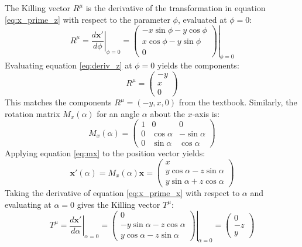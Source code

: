 \documentclass[11pt, a4paper]{report}
\begin{document}
The Killing vector $R^\mu$ is the derivative of the transformation in equation \eqref{eq:x_prime_z} with respect to the parameter $\phi$, evaluated at $\phi = 0$:
\begin{equation} R^\mu = \left. \frac{d\mathbf{x}'}{d\phi} \right|_{\phi=0} = \left. \begin{pmatrix} -x\sin\phi - y\cos\phi \\ x\cos\phi - y\sin\phi \\ 0 \end{pmatrix} \right|_{\phi=0} \label{eq:deriv_z} \end{equation}
Evaluating equation \eqref{eq:deriv_z} at $\phi = 0$ yields the components:
\begin{equation} R^\mu = \begin{pmatrix} -y \\ x \\ 0 \end{pmatrix} \label{eq:R_z_final} \end{equation}
This matches the components $R^\mu = (-y, x, 0)$ from the textbook.
Similarly, the rotation matrix $M_x(\alpha)$ for an angle $\alpha$ about the $x$-axis is:
\begin{equation} M_x(\alpha) = \begin{pmatrix} 1 & 0 & 0 \\ 0 & \cos\alpha & -\sin\alpha \\ 0 & \sin\alpha & \cos\alpha \end{pmatrix} \label{eq:mx} \end{equation}
Applying equation \eqref{eq:mx} to the position vector yields:
\begin{equation} \mathbf{x}'(\alpha) = M_x(\alpha) \mathbf{x} = \begin{pmatrix} x \\ y\cos\alpha - z\sin\alpha \\ y\sin\alpha + z\cos\alpha \end{pmatrix} \label{eq:x_prime_x} \end{equation}
Taking the derivative of equation \eqref{eq:x_prime_x} with respect to $\alpha$ and evaluating at $\alpha = 0$ gives the Killing vector $T^\mu$:
\begin{equation} T^\mu = \left. \frac{d\mathbf{x}'}{d\alpha} \right|_{\alpha=0} = \left. \begin{pmatrix} 0 \\ -y\sin\alpha - z\cos\alpha \\ y\cos\alpha - z\sin\alpha \end{pmatrix} \right|_{\alpha=0} = \begin{pmatrix} 0 \\ -z \\ y \end{pmatrix} \label{eq:T_x_final} \end{equation}
\end{document}
